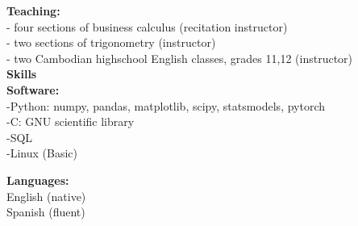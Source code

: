 \documentclass[12pt]{amsart}
\newcommand{\n}{\noindent}
\begin{document}
\n \textbf{Teaching:}\\ 
- four sections of business calculus (recitation instructor)\\
- two sections of trigonometry (instructor)\\
- two Cambodian highschool English classes, grades 11,12 (instructor)\\

\smallskip \n \textbf{\large Skills}\vspace{2mm}\\
\n \textbf{Software:}\\
-Python: numpy, pandas, matplotlib, scipy, statsmodels, pytorch\\
-C: GNU scientific library\\
-SQL\\
-Linux (Basic)\vspace{2mm}


\n \textbf{Languages:}\\
English (native)\\
Spanish (fluent)
\end{document}
